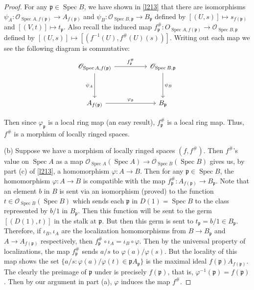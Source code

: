 \documentclass[12pt]{article}
\theoremstyle{remark}
\newcommand{\Spec}[0]{\operatorname{Spec}}
\begin{document}
\begin{proof}
	For any $\mathfrak p\in\Spec B$, we have shown in \autoref{l213} that there are isomorphisms $\psi_A:\mathscr O_{\Spec A, f(\mathfrak p)}\to A_{f(\mathfrak p)}$ and $\psi_B:\mathscr O_{\Spec B, \mathfrak p}\to B_{\mathfrak p}$ defined by $[(U, s)]\mapsto s_{f(\mathfrak p)}$ and $[(V, t)]\mapsto t_{\mathfrak p}$. Also recall the induced map $f^\#_{\mathfrak p}:O_{\Spec A, f(\mathfrak p)}\to \mathscr O_{\Spec B, \mathfrak p}$ defined by $[(U, s)]\mapsto [(f^{-1}(U), f^\#(U)(s))]$. Writing out each map we see the following diagram is commutative:
	\[
	\begin{tikzcd}
{\mathscr O_{\operatorname{Spec} A, f(\mathfrak p)}} \arrow[rr, "f^\#_{\mathfrak p}"] \arrow[dd, "\psi_A"'] &  & {\mathscr O_{\operatorname{Spec} B, \mathfrak p}} \arrow[dd, "\psi_B"] \\
                                                                                                            &  &                                                                        \\
A_{f(\mathfrak p)} \arrow[rr, "\varphi_{\mathfrak p}"]                                                      &  & B_{\mathfrak p}                                                       
\end{tikzcd}
	\]
	
	Then since $\varphi_{\mathfrak p}$ is a local ring map (an easy result), $f^\#_{\mathfrak p}$ is a local ring map. Thus, $f^\#$ is a morphism of locally ringed spaces.
	
	(b) Suppose we have a morphism of locally ringed spaces $(f, f^\#)$. Then $f^\#$'s value on $\Spec A$ as a map $\mathscr O_{\Spec A}(\Spec A)\to \mathscr O_{\Spec B}(\Spec B)$ gives us, by part (c) of \autoref{l213}, a homomorphism $\varphi: A\to B$. Then for any $\mathfrak p\in \Spec B$, the homomorphism $\varphi: A\to B$ is compatible with the map $f^\#_{\mathfrak p}:A_{f(\mathfrak p)}\to B_{\mathfrak p}$. Note that an element $b$ in $B$ is sent via an isomorphism (proved) to the function $t\in \mathscr O_{\Spec B}(\Spec B)$ which sends each $\mathfrak p$ in $D(1)=\Spec B$ to the class represented by $b/1$ in $B_{\mathfrak p}$. Then this function will be sent to the germ $[(D(1), t)]$ in the stalk at $\mathfrak p$. But then this germ is sent to $t_{\mathfrak p}=b/1\in B_{\mathfrak p}$. Therefore, if $\iota_B, \iota_A$ are the localization homomorphisms from $B\to B_{\mathfrak p}$ and $A\to A_{f(\mathfrak p)}$ respectively, then $f^\#_{\mathfrak p}\circ \iota_A=\iota_B\circ \varphi$. Then by the universal property of localizations, the map $f^\#_{\mathfrak p}$ sends $a/s$ to $\varphi(a)/\varphi(s)$. But the locality of this map shows the set $\{a/s:\varphi(a)/\varphi(t)\in \mathfrak pA_{\mathfrak p}\}$ is the maximal ideal $f(\mathfrak p)A_{f(\mathfrak p)}$. The clearly the preimage of $\mathfrak p$ under is precisely $f(\mathfrak p)$, that is, $\varphi^{-1}(\mathfrak p)=f(\mathfrak p)$. Then by our argument in part (a), $\varphi$ induces the map $f^\#$.
	\end{proof}
\end{document}
